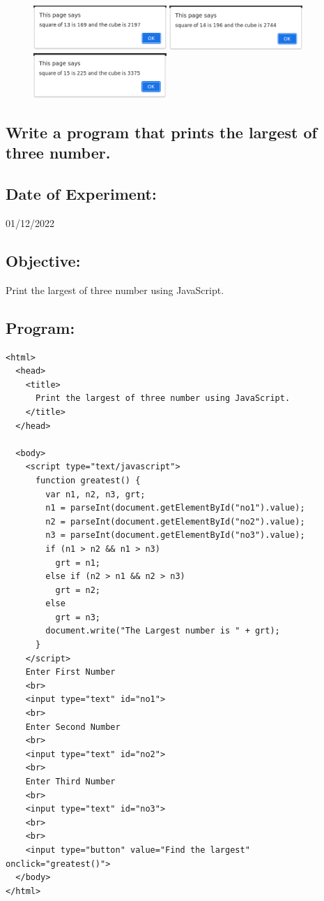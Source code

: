 \documentclass[12pt, a4paper]{article}
\begin{document}
\begin{figure}[h]
  \includegraphics[width=0.45\textwidth]{25}
  \includegraphics[width=0.45\textwidth]{26}
  \includegraphics[width=0.45\textwidth]{27}
\end{figure}

\pagebreak

\begin{tcolorbox}
  \section{Write a program that prints the largest of three number.}
\end{tcolorbox}
\subsection*{Date of Experiment:}
 01/12/2022
\subsection*{Objective:}
Print the largest of three number using JavaScript.

\subsection*{Program:}
\begin{lstlisting}
<html>
  <head>
    <title>
      Print the largest of three number using JavaScript.
    </title>
  </head>

  <body>
    <script type="text/javascript">
      function greatest() {
        var n1, n2, n3, grt;
        n1 = parseInt(document.getElementById("no1").value);
        n2 = parseInt(document.getElementById("no2").value);
        n3 = parseInt(document.getElementById("no3").value);
        if (n1 > n2 && n1 > n3)
          grt = n1;
        else if (n2 > n1 && n2 > n3)
          grt = n2;
        else
          grt = n3;
        document.write("The Largest number is " + grt);
      }
    </script>
    Enter First Number 
    <br>
    <input type="text" id="no1">
    <br>
    Enter Second Number 
    <br>
    <input type="text" id="no2">
    <br>
    Enter Third Number 
    <br>
    <input type="text" id="no3">
    <br>
    <br>
    <input type="button" value="Find the largest" onclick="greatest()">
  </body>
</html>
\end{lstlisting}
\end{document}
